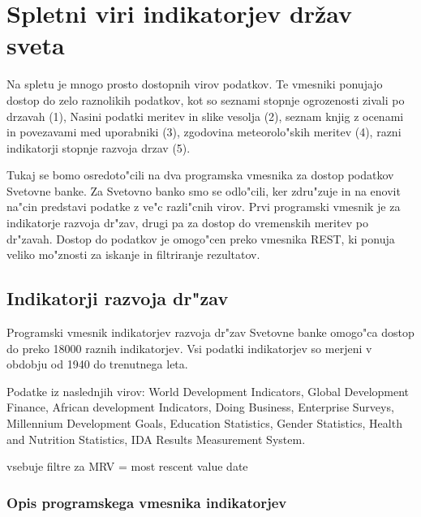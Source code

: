 \chapter{Spletni viri indikatorjev držav sveta}

Na spletu je mnogo prosto dostopnih virov podatkov. Te vmesniki ponujajo dostop
do zelo raznolikih podatkov, kot so seznami stopnje ogrozenosti zivali po
drzavah (1), Nasini podatki meritev in slike vesolja (2), seznam knjig z 
ocenami in povezavami med uporabniki (3), zgodovina meteorolo"skih meritev (4),
razni indikatorji stopnje razvoja drzav (5).



% 
% 
% 
% 




Tukaj se bomo osredoto"cili
na dva programska vmesnika za dostop podatkov Svetovne banke. Za Svetovno banko
smo se odlo"cili, ker zdru"zuje in na enovit na"cin predstavi podatke z ve"c
razli"cnih virov. Prvi programski vmesnik je za indikatorje razvoja dr"zav,
drugi pa za dostop do vremenskih meritev po dr"zavah. Dostop do podatkov je
omogo"cen preko vmesnika REST, ki ponuja veliko mo"znosti za iskanje in
filtriranje rezultatov.


\section{Indikatorji razvoja dr"zav}

Programski vmesnik indikatorjev razvoja dr"zav Svetovne banke omogo"ca dostop
do preko 18000 raznih indikatorjev. Vsi podatki indikatorjev so merjeni v
obdobju od 1940 do trenutnega leta. 

Podatke iz naslednjih virov:
World Development Indicators, 
Global Development Finance, 
African development Indicators, 
Doing Business,
Enterprise Surveys, 
Millennium Development Goals, 
Education Statistics, 
Gender Statistics,
Health and Nutrition Statistics, 
IDA Results Measurement System.


vsebuje filtre za
MRV = most rescent value
date





\subsection{Opis programskega vmesnika indikatorjev}


